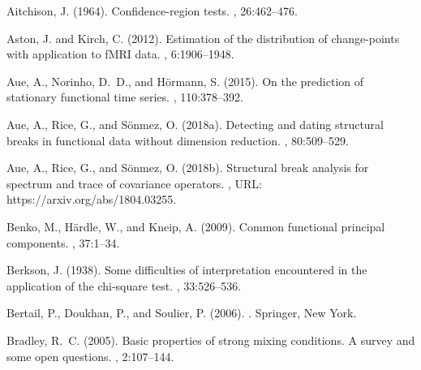 \documentclass[11pt]{article}
\numberwithin{equation}{section}
\numberwithin{theorem}{section}
\numberwithin{lemma}{section}
\numberwithin{proposition}{section}
\numberwithin{cor}{section}
\numberwithin{definition}{section}
\numberwithin{cons}{section}
\numberwithin{rem}{section}
\numberwithin{exa}{section}
\numberwithin{table}{section}
\numberwithin{figure}{section}
\numberwithin{algo}{section}
\begin{document}
{{%
\itemsep=0.015pt
% 

\begin{thebibliography}{}

Aitchison, J. (1964).
\newblock Confidence-region tests.
,
  26:462--476.

Aston, J. and Kirch, C. (2012).
\newblock Estimation of the distribution of change-points with application to
  {fMRI} data.
, 6:1906--1948.

Aue, A., Norinho, D.~D., and H{\"o}rmann, S. (2015).
\newblock On the prediction of stationary functional time series.
, 110:378--392.

Aue, A., Rice, G., and S\"{o}nmez, O. (2018a).
\newblock Detecting and dating structural breaks in functional data without
  dimension reduction.
,
  80:509--529.

Aue, A., Rice, G., and S\"{o}nmez, O. (2018b).
\newblock Structural break analysis for spectrum and trace of covariance
  operators.
, URL:
  https://arxiv.org/abs/1804.03255.

Benko, M., H{\"a}rdle, W., and Kneip, A. (2009).
\newblock Common functional principal components.
, 37:1--34.

Berkson, J. (1938).
\newblock Some difficulties of interpretation encountered in the application of
  the chi-square test.
, 33:526--536.

Bertail, P., Doukhan, P., and Soulier, P. (2006).
.
\newblock Springer, New York.

Bradley, R.~C. (2005).
\newblock Basic properties of strong mixing conditions. {A} survey and some
  open questions.
, 2:107--144.


\end{thebibliography}}}
\end{document}
